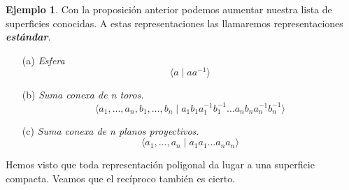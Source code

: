 \documentclass[10pt]{report}
\newcommand{\enfatiza}[1]{\textbf{\textit{#1}}}
\theoremstyle{definition}
\newtheorem{eje}[defin]{Ejemplo}
\begin{document}
\begin{eje}
Con la proposición anterior podemos aumentar nuestra lista de superficies conocidas. A estas representaciones las llamaremos representaciones \enfatiza{estándar}.
\begin{itemize}
\item [(a)] \textit{Esfera} 
$$\langle a \mid aa^{-1} \rangle$$
\item[(b)] \textit{Suma conexa de n toros.}
$$\langle a_1,\dots ,a_n, b_1,\dots ,b_n\mid a_1b_1a_1^{-1}b_1^{-1}\dots a_nb_na_n^{-1}b_n^{-1}\rangle$$ 
\item[(c)] \textit{Suma conexa de n planos proyectivos.} 
$$\langle a_1,\dots ,a_n\mid a_1a_1\dots a_na_n\rangle$$
\end{itemize}
\end{eje}

Hemos visto que toda representación poligonal da lugar a una superficie compacta. Veamos que el recíproco también es cierto.
\end{document}
